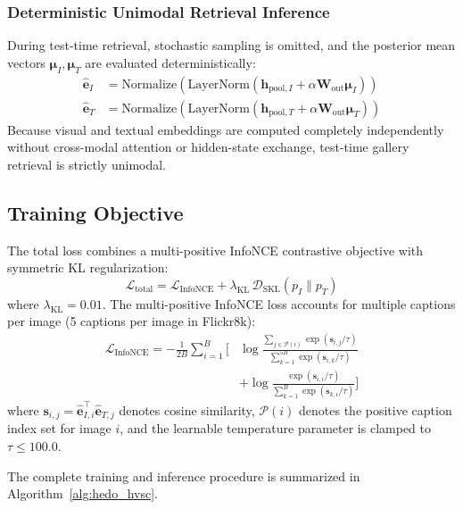 \documentclass[journal]{IEEEtran}
\begin{document}
\subsubsection{Deterministic Unimodal Retrieval Inference}
During test-time retrieval, stochastic sampling is omitted, and the posterior mean vectors $\boldsymbol{\mu}_I, \boldsymbol{\mu}_T$ are evaluated deterministically:
\begin{align}
\hat{\mathbf{e}}_I &= \text{Normalize}\left( \text{LayerNorm}(\mathbf{h}_{\text{pool}, I} + \alpha \mathbf{W}_{\text{out}} \boldsymbol{\mu}_I) \right) \\
\hat{\mathbf{e}}_T &= \text{Normalize}\left( \text{LayerNorm}(\mathbf{h}_{\text{pool}, T} + \alpha \mathbf{W}_{\text{out}} \boldsymbol{\mu}_T) \right)
\end{align}
Because visual and textual embeddings are computed completely independently without cross-modal attention or hidden-state exchange, test-time gallery retrieval is strictly unimodal.

\subsection{Training Objective}
The total loss combines a multi-positive InfoNCE contrastive objective with symmetric KL regularization:
\begin{equation}
\mathcal{L}_{\text{total}} = \mathcal{L}_{\text{InfoNCE}} + \lambda_{\text{KL}} \, \mathcal{D}_{\text{SKL}}(p_I \parallel p_T)
\end{equation}
where $\lambda_{\text{KL}} = 0.01$. The multi-positive InfoNCE loss accounts for multiple captions per image (5 captions per image in Flickr8k):
\begin{align}
\mathcal{L}_{\text{InfoNCE}} = -\frac{1}{2B} \sum_{i=1}^B \Bigg[ &\log \frac{\sum_{j \in \mathcal{P}(i)} \exp(\mathbf{s}_{i,j} / \tau)}{\sum_{k=1}^{5B} \exp(\mathbf{s}_{i,k} / \tau)} \nonumber \\
&+ \log \frac{\exp(\mathbf{s}_{i,i} / \tau)}{\sum_{k=1}^B \exp(\mathbf{s}_{k,i} / \tau)} \Bigg]
\end{align}
where $\mathbf{s}_{i,j} = \hat{\mathbf{e}}_{I, i}^\top \hat{\mathbf{e}}_{T, j}$ denotes cosine similarity, $\mathcal{P}(i)$ denotes the positive caption index set for image $i$, and the learnable temperature parameter is clamped to $\tau \le 100.0$.

The complete training and inference procedure is summarized in Algorithm~\ref{alg:hedo_hvsc}.
\end{document}
